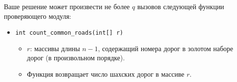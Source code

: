 Ваше решение может произвести не более $q$ вызовов следующей функции проверяющего
модуля:

\begin{itemize}
\item \texttt{int count\_common\_roads(int[] r)}
\begin{itemize}
\item $r$: массивы длины $n - 1$, содержащий номера дорог в золотом наборе дорог (в
произвольном порядке).
\item Функция возвращает число шахских дорог в массиве $r$.
\end{itemize}
\end{itemize}
